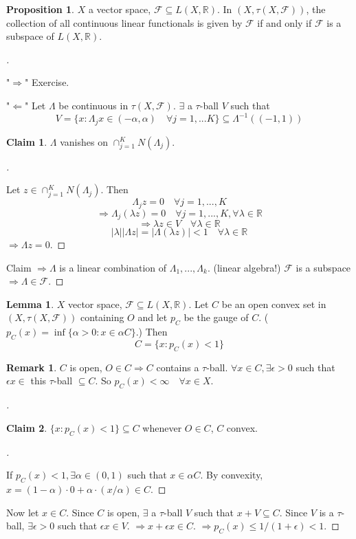 \documentclass{article}
\theoremstyle{definition}
\newtheorem{lem}{Lemma}
\newtheorem{rem}{Remark}
\newtheorem{prop}{Proposition}
\newtheorem*{clm}{Claim}
\newenvironment{proofs}[1][\proofname]{%
  \begin{proof}[#1]$ $\par\nobreak\ignorespaces
}{%
  \end{proof}
}
\newcommand{\F}{\mathcal F}
\newcommand{\RR}{\mathbb R}
\newcommand{\Ra}{\Rightarrow}
\newcommand{\La}{\Leftarrow}
\begin{document}
\begin{prop}
	$X$ a vector space, $\F \subseteq L(X, \RR)$.
	In $(X, \tau(X, \F))$, the collection of all continuous linear functionals is given by $\F$ if and only if $\F$ is a subspace of $L(X, \RR)$.
\end{prop}

\begin{proofs}
	"$\Ra$" Exercise.
	\par "$\La$" Let $\Lambda$ be continuous in $\tau(X, \F)$.
	$\exists$ a $\tau$-ball $V$ such that
	\[
		V = \{ x: \Lambda_j x \in (-\alpha, \alpha) \quad \forall j = 1, ... K\} \subseteq \Lambda^{-1}((-1, 1))
	\]
	\begin{clm}
		$\Lambda$ vanishes on $\cap_{j = 1}^K N(\Lambda_j)$.
	\end{clm}

	\begin{proofs}
		Let $z \in \cap_{j = 1}^K N(\Lambda_j)$.
		Then 
		\[
			\Lambda_j z = 0 \quad \forall j = 1, ..., K
		\]
		\[
			\Ra \Lambda_j(\lambda z) = 0 \quad \forall j = 1, ..., K , \forall \lambda \in \RR
		\]
		\[
			\Ra \lambda z \in V \quad \forall \lambda \in \RR
		\]
		\[
			|\lambda||\Lambda z| = |\Lambda(\lambda z)| < 1 \quad \forall \lambda \in \RR
		\]
		$\Ra \Lambda z = 0$.
	\end{proofs}
	Claim $\Ra \Lambda$ is a linear combination of $\Lambda_1, ..., \Lambda_k$. (linear algebra!)
	$\F$ is a subspace $\Ra \Lambda \in \F$.
\end{proofs}

\begin{lem}
	$X$ vector space, $\F \subseteq L(X, \RR)$.
	Let $C$ be an open convex set in $(X, \tau(X, \F))$ containing $O$ and let $p_C$ be the gauge of $C$. ($p_C(x) = \inf\{\alpha > 0: x \in \alpha C\}$.)
	Then 
	\[
		C = \{x: p_C(x) < 1\}
	\]
\end{lem}

\begin{rem}
	$C$ is open, $O \in C \Ra C$ contains a $\tau$-ball.
	$\forall x \in C, \exists \epsilon > 0$ such that $\epsilon x \in $ this $\tau$-ball $\subseteq C$.
	So $p_C(x) < \infty \quad \forall x \in X$.
\end{rem}

\begin{proofs}
	\begin{clm}
		$\{x:p_C(x) < 1\} \subseteq C$ whenever $O \in C$, $C$ convex.
	\end{clm}

	\begin{proofs}
		If $p_C(x) < 1, \exists \alpha \in (0, 1)$ such that $x \in \alpha C$.
		By convexity, $x = (1 - \alpha) \cdot 0 + \alpha \cdot (x/\alpha) \in C$.
	\end{proofs}
	Now let $x \in C$.
	Since $C$ is open, $\exists$ a $\tau$-ball $V$ such that $x + V \subseteq C$.
	Since $V$ is a $\tau$-ball, $\exists \epsilon > 0$ such that $\epsilon x \in V$.
	$\Ra x + \epsilon x \in C$.
	$\Ra p_C(x) \leq 1/(1 + \epsilon) < 1$.
\end{proofs}
\end{document}
